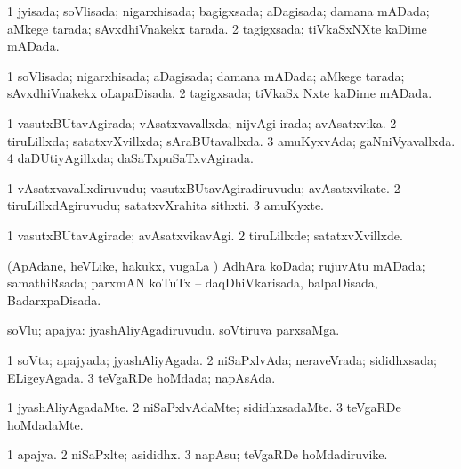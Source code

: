 {{\bentry
{} 
\gl{\gu}
\expl{}
\bmng
\bnum
\num{1} jyisada; soVlisada; nigarxhisada; bagigxsada; aDagisada; damana mADada; aMkege tarada; sAvxdhiVnakekx tarada. 
\num{2} tagigxsada; tiVkaSxNXte kaDime mADada. 
\enum
\emng
\eentry

\bentry
{} 
\gl{\gu}
\expl{}
\bmng
\bnum
\num{1} soVlisada; nigarxhisada; aDagisada; damana mADada; aMkege tarada; sAvxdhiVnakekx oLapaDisada. 
\num{2} tagigxsada; tiVkaSx Nxte kaDime mADada. 
\enum
\emng
\eentry

\bentry
{} 
\gl{\gu}
\expl{}
\bmng
\bnum
\num{1} vasutxBUtavAgirada; vAsatxvavallxda; nijvAgi irada; avAsatxvika. 
\num{2} tiruLillxda; satatxvXvillxda; sAraBUtavallxda. 
\num{3} amuKyxvAda; gaNniVyavallxda. 
\num{4} daDUtiyAgillxda; daSaTxpuSaTxvAgirada. 
\enum
\emng
\eentry

\bentry
{} 
\gl{\nA}
\expl{}
\bmng
\bnum
\num{1} vAsatxvavallxdiruvudu; vasutxBUtavAgiradiruvudu; avAsatxvikate. 
\num{2} tiruLillxdAgiruvudu; satatxvXrahita sithxti. 
\num{3} amuKyxte. 
\enum
\emng
\eentry

\bentry
{} 
\gl{\kirxvi}
\expl{}
\bmng
\bnum
\num{1} vasutxBUtavAgirade; avAsatxvikavAgi. 
\num{2} tiruLillxde; satatxvXvillxde. 
\enum
\emng
\eentry

\bentry
{} 
\gl{\gu}
\expl{}
\bmng
(ApAdane, heVLike, hakukx, \mo vugaLa \vi) AdhAra koDada; rujuvAtu mADada; samathiRsada; parxmAN koTuTx -- daqDhiVkarisada, balpaDisada, BadarxpaDisada. 
\emng
\eentry

\bentry
{} 
\gl{\nA}
\expl{}
\bmng
soVlu; apajya: 
\banum
{} jyashAliyAgadiruvudu. 
 soVtiruva parxsaMga. 
\eanum
\emng
\eentry

\bentry
{} 
\gl{\gu}
\expl{}
\bmng
\bnum
\num{1} soVta; apajyada; jyashAliyAgada. 
\num{2} niSaPxlvAda; neraveVrada; sididhxsada; ELigeyAgada. 
\num{3} teVgaRDe hoMdada; napAsAda. 
\enum
\emng
\eentry

\bentry
{} 
\gl{\kirxvi}
\bmng
\bnum
\num{1} jyashAliyAgadaMte. 
\num{2} niSaPxlvAdaMte; sididhxsadaMte. 
\num{3} teVgaRDe hoMdadaMte. 
\enum
\emng
\eentry

\bentry
{} 
\gl{\nA}
\expl{}
\bmng
\bnum
\num{1} apajya. 
\num{2} niSaPxlte; asididhx. 
\num{3} napAsu; teVgaRDe hoMdadiruvike. 
\enum
\emng
\eentry

}}
